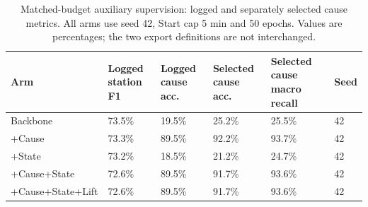 \begin{table}[p]
\centering\scriptsize
\caption{Matched-budget auxiliary supervision: logged and separately selected cause metrics. All arms use seed 42, Start cap 5 min and 50 epochs. Values are percentages; the two export definitions are not interchanged.}
\begin{tabularx}{\textwidth}{lXXXXX}
\toprule
Arm & Logged station F1 & Logged cause acc. & Selected cause acc. & Selected cause macro recall & Seed \\
\midrule
Backbone & 73.5\% & 19.5\% & 25.2\% & 25.5\% & 42 \\
+Cause & 73.3\% & 89.5\% & 92.2\% & 93.7\% & 42 \\
+State & 73.2\% & 18.5\% & 21.2\% & 24.7\% & 42 \\
+Cause+State & 72.6\% & 89.5\% & 91.7\% & 93.6\% & 42 \\
+Cause+State+Lift & 72.6\% & 89.5\% & 91.7\% & 93.6\% & 42 \\
\bottomrule
\end{tabularx}
\end{table}
